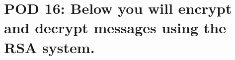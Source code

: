 \documentclass{article}
\newcommand{\YearPath}{../../../LatexConfig} %
\newcommand{\SemesterPath}{../../LatexConfig} %
\newcommand{\ClassPath}{../LatexConfig} %
\begin{document}




\section{POD 16: Below you will encrypt and decrypt messages using the RSA system.}

\end{document}
